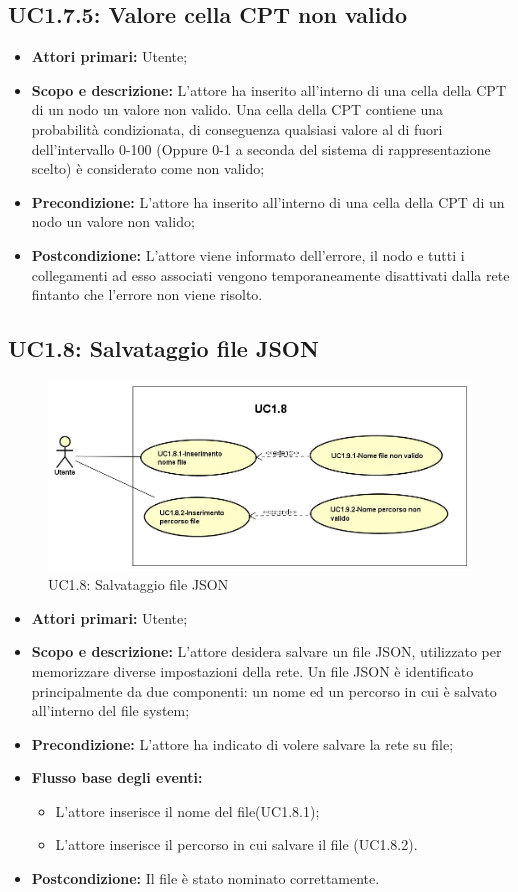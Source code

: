 \subsection{UC1.7.5: Valore cella CPT non valido} 
\begin{itemize} 
	\item{\textbf{Attori primari:} Utente;} 
	\item{\textbf{Scopo e descrizione:} L'attore ha inserito all'interno di una cella della CPT di un nodo un valore non valido. Una cella della CPT contiene una probabilità condizionata, di conseguenza qualsiasi valore al di fuori dell'intervallo 0-100 (Oppure 0-1 a seconda del sistema di rappresentazione scelto) è considerato come non valido;} 
	\item{\textbf{Precondizione:} L'attore ha inserito all'interno di una cella della CPT di un nodo un valore non valido;} 
	\item{\textbf{Postcondizione:} L'attore viene informato dell'errore, il nodo e tutti i collegamenti ad esso associati vengono temporaneamente disattivati dalla rete fintanto che l'errore non viene risolto.} 
\end{itemize} 
\subsection{UC1.8: Salvataggio file JSON} 
\begin{figure} [H]
	\centering
	\includegraphics[scale=0.45]{Img/UC1-8} 
	\caption{UC1.8: Salvataggio file JSON} \label{} 
\end{figure} 
\begin{itemize} 
	\item{\textbf{Attori primari:} Utente;} 
	\item{\textbf{Scopo e descrizione:} L'attore desidera salvare un file JSON, utilizzato per memorizzare diverse impostazioni della rete. Un file JSON è identificato principalmente da due componenti: un nome ed un percorso in cui è salvato all'interno del file system;} 
	\item{\textbf{Precondizione:} L'attore ha indicato di volere salvare la rete su file;} 
	\item{\textbf{Flusso base degli eventi:} } 
	\begin{itemize} 
		\item{L'attore inserisce il nome del file(UC1.8.1);} 
		\item{L'attore inserisce il percorso in cui salvare il file (UC1.8.2).} 
	\end{itemize} 
	\item{\textbf{Postcondizione:} Il file è stato nominato correttamente.} 
\end{itemize} 
